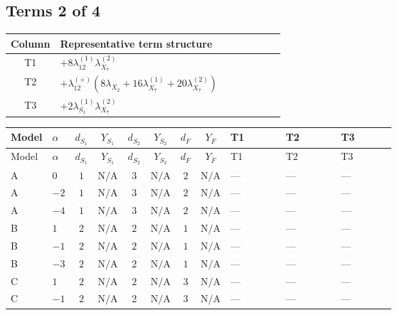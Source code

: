 \documentclass[8pt]{article}
\begin{document}
\begin{landscape}
\subsection*{Terms 2 of 4}
\begin{center}
\begin{tabular}{@{}c >{\raggedright\arraybackslash}p{0.82\linewidth}@{}}
\toprule
Column & Representative term structure \\
\midrule
T1 & \(\displaystyle +8 {\lambda_{12}^{(1)}} {\lambda_{X_{7}}^{(2)}}\) \\
\midrule
T2 & \(\displaystyle +{\lambda_{12}^{(\times)}} (8 {\lambda_{X_{2}}}+16 {\lambda_{X_{7}}^{(1)}}+20 {\lambda_{X_{7}}^{(2)}})\) \\
\midrule
T3 & \(\displaystyle +2 {\lambda_{S_1}^{(1)}} {\lambda_{X_{7}}^{(2)}}\) \\
\midrule
\bottomrule
\end{tabular}
\end{center}
\smallskip
\tiny
\begin{longtable}{@{}llcccccc >{\raggedright\arraybackslash}p{0.21\linewidth} >{\raggedright\arraybackslash}p{0.21\linewidth} >{\raggedright\arraybackslash}p{0.21\linewidth}@{}}
\toprule
Model & $\alpha$ & $d_{S_1}$ & $Y_{S_1}$ & $d_{S_2}$ & $Y_{S_2}$ & $d_F$ & $Y_F$ & T1 & T2 & T3 \\
\midrule
\endfirsthead
\toprule
Model & $\alpha$ & $d_{S_1}$ & $Y_{S_1}$ & $d_{S_2}$ & $Y_{S_2}$ & $d_F$ & $Y_F$ & T1 & T2 & T3 \\
\midrule
\endhead
A & $0$ & $1$ & $\text{N/A}$ & $3$ & $\text{N/A}$ & $2$ & $\text{N/A}$ & --- & --- & --- \\
\midrule
A & $-2$ & $1$ & $\text{N/A}$ & $3$ & $\text{N/A}$ & $2$ & $\text{N/A}$ & --- & --- & --- \\
\midrule
A & $-4$ & $1$ & $\text{N/A}$ & $3$ & $\text{N/A}$ & $2$ & $\text{N/A}$ & --- & --- & --- \\
\midrule
B & $1$ & $2$ & $\text{N/A}$ & $2$ & $\text{N/A}$ & $1$ & $\text{N/A}$ & --- & --- & --- \\
\midrule
B & $-1$ & $2$ & $\text{N/A}$ & $2$ & $\text{N/A}$ & $1$ & $\text{N/A}$ & --- & --- & --- \\
\midrule
B & $-3$ & $2$ & $\text{N/A}$ & $2$ & $\text{N/A}$ & $1$ & $\text{N/A}$ & --- & --- & --- \\
\midrule
C & $1$ & $2$ & $\text{N/A}$ & $2$ & $\text{N/A}$ & $3$ & $\text{N/A}$ & --- & --- & --- \\
\midrule
C & $-1$ & $2$ & $\text{N/A}$ & $2$ & $\text{N/A}$ & $3$ & $\text{N/A}$ & --- & --- & --- \\

\end{longtable}
\end{landscape}
\end{document}
